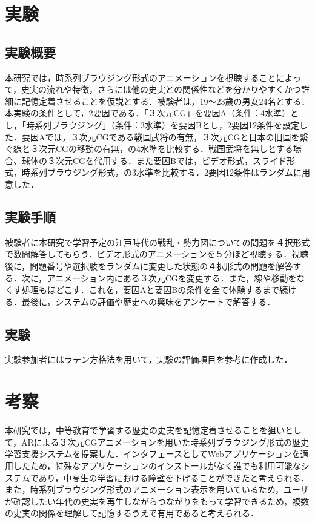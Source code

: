 \documentclass[a4paper,dvipdfmx]{hisken}
\begin{document}
\section{実験}
\subsection{実験概要}
本研究では，時系列ブラウジング形式のアニメーションを視聴することによって，史実の流れや特徴，さらには他の史実との関係性などを分かりやすくかつ詳細に記憶定着させることを仮説とする．被験者は，19〜23歳の男女24名とする．本実験の条件として，2要因である．「３次元CG」を要因A（条件：4水準）とし，「時系列ブラウジング」（条件：3水準）を要因Bとし，2要因12条件を設定した．要因Aでは，３次元CGである戦国武将の有無，３次元CGと日本の旧国を繋ぐ線と３次元CGの移動の有無，の4水準を比較する．戦国武将を無しとする場合、球体の３次元CGを代用する．また要因Bでは，ビデオ形式，スライド形式，時系列ブラウジング形式，の3水準を比較する．2要因12条件はランダムに用意した．

\subsection{実験手順}
被験者に本研究で学習予定の江戸時代の戦乱・勢力図についての問題を４択形式で数問解答してもらう．ビデオ形式のアニメーションを５分ほど視聴する．視聴後に，問題番号や選択肢をランダムに変更した状態の４択形式の問題を解答する．次に，アニメーション内にある３次元CGを変更する．また，線や移動をなくす処理もほどこす．これを，要因Aと要因Bの条件を全て体験するまで続ける．最後に，システムの評価や歴史への興味をアンケートで解答する．


\subsection{実験}
実験参加者にはラテン方格法\cite{laten}を用いて，実験の評価項目を参考に作成した．



\section{考察}

本研究では，中等教育で学習する歴史の史実を記憶定着させることを狙いとして，ARによる３次元CGアニメーションを用いた時系列ブラウジング形式の歴史学習支援システムを提案した．インタフェースとしてWebアプリケーションを適用したため，特殊なアプリケーションのインストールがなく誰でも利用可能なシステムであり，中高生の学習における障壁を下げることができたと考えられる．また，時系列ブラウジング形式のアニメーション表示を用いているため，ユーザが確認したい年代の史実を再生しながらつながりをもって学習できるため，複数の史実の関係を理解して記憶するうえで有用であると考えられる．
\end{document}
